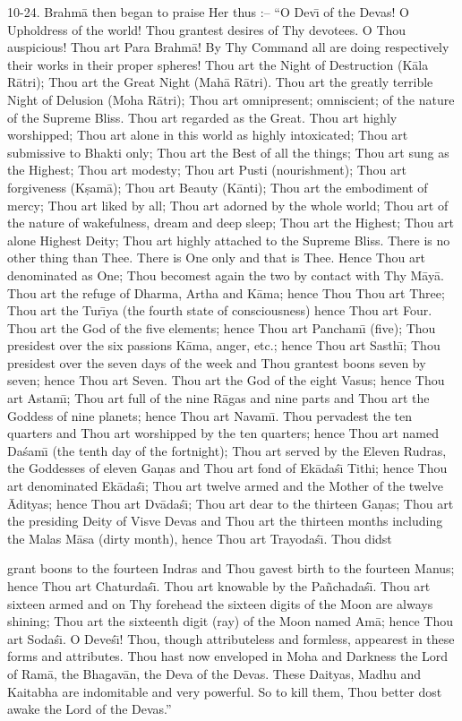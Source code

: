 10-24. Brahm\=a then began to praise Her thus :-- ``O Dev\={\i} of the Devas! O Upholdress of the world! Thou grantest desires of Thy devotees. O Thou auspicious! Thou art Para Brahm\=a! By Thy Command all are doing respectively their works in their proper spheres! Thou art the Night of Destruction (K\=ala R\=atri); Thou art the Great Night (Mah\=a R\=atri). Thou art the greatly terrible Night of Delusion (Moha R\=atri); Thou art omnipresent; omniscient; of the nature of the Supreme Bliss. Thou art regarded as the Great. Thou art highly worshipped; Thou art alone in this world as highly intoxicated; Thou art submissive to Bhakti only; Thou art the Best of all the things; Thou art sung as the Highest; Thou art modesty; Thou art Pusti (nourishment); Thou art forgiveness (K\d{s}am\=a); Thou art Beauty (K\=anti); Thou art the embodiment of mercy; Thou art liked by all; Thou art adorned by the whole world; Thou art of the nature of wakefulness, dream and deep sleep; Thou art the Highest; Thou art alone Highest Deity; Thou art highly attached to the Supreme Bliss. There is no other thing than Thee. There is One only and that is Thee. Hence Thou art denominated as One; Thou becomest again the two by contact with Thy M\=ay\=a. Thou art the refuge of Dharma, Artha and K\=ama; hence Thou Thou art Three; Thou art the Tur\={\i}ya (the fourth state of consciousness) hence Thou art Four. Thou art the God of the five elements; hence Thou art Pancham\={\i} (five); Thou presidest over the six passions K\=ama, anger, etc.; hence Thou art Sasth\={\i}; Thou presidest over the seven days of the week and Thou grantest boons seven by seven; hence Thou art Seven. Thou art the God of the eight Vasus; hence Thou art Astam\={\i}; Thou art full of the nine R\=agas and nine parts and Thou art the Goddess of nine planets; hence Thou art Navam\={\i}. Thou pervadest the ten quarters and Thou art worshipped by the ten quarters; hence Thou art named Da\'sam\={\i} (the tenth day of the fortnight); Thou art served by the Eleven Rudras, the Goddesses of eleven Ga\d{n}as and Thou art fond of Ek\=ada\'s\={\i} Tithi; hence Thou art denominated Ek\=ada\'s\={\i}; Thou art twelve armed and the Mother of the twelve \=Adityas; hence Thou art Dv\=ada\'s\={\i}; Thou art dear to the thirteen Ga\d{n}as; Thou art the presiding Deity of Visve Devas and Thou art the thirteen months including the Malas M\=asa (dirty month), hence Thou art Trayoda\'s\={\i}. Thou didst

grant boons to the fourteen Indras and Thou gavest birth to the fourteen Manus; hence Thou art Chaturda\'s\={\i}. Thou art knowable by the Pa\~nchada\'s\={\i}. Thou art sixteen armed and on Thy forehead the sixteen digits of the Moon are always shining; Thou art the sixteenth digit (ray) of the Moon named Am\=a; hence Thou art Soda\'s\={\i}. O Deve\'s\={\i}! Thou, though attributeless and formless, appearest in these forms and attributes. Thou hast now enveloped in Moha and Darkness the Lord of Ram\=a, the Bhagav\=an, the Deva of the Devas. These Daityas, Madhu and Kaitabha are indomitable and very powerful. So to kill them, Thou better dost awake the Lord of the Devas.''

